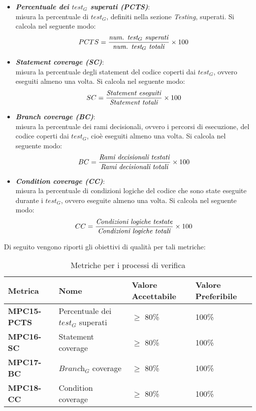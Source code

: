 \begin{itemize}
    \item \textbf{\emph{Percentuale dei $\textit{test}_G$ superati (PCTS)}}:\\
    misura la percentuale di $\textit{test}_G$, definiti nella sezione \emph{Testing}, superati. Si calcola nel seguente modo:
    \[
    PCTS = \frac{\text{\emph{num. $\textit{test}_G$ superati}}}{\text{\emph{{num. $\textit{test}_G$ totali}}}}\times100
    \]
    \item \textbf{\emph{Statement coverage (SC)}}: \\
    misura la percentuale degli statement del codice coperti dai $\textit{test}_G$, ovvero eseguiti almeno una volta. Si calcola nel seguente modo:
      \[
    SC = \frac{\text{\emph{Statement eseguiti}}}{\text{\emph{{Statement totali}}}}\times100
    \]
    \item \textbf{\emph{Branch coverage (BC)}}: \\
    misura la percentuale dei rami decisionali, ovvero i percorsi di esecuzione, del codice coperti dai $\textit{test}_G$, cioè eseguiti almeno una volta. Si calcola nel seguente modo:
     \[
    BC = \frac{\text{\emph{Rami decisionali testati}}}{\text{\emph{{Rami decisionali totali}}}}\times100
    \]
    \item \textbf{\emph{Condition coverage (CC)}}:\\
    misura la percentuale di condizioni logiche del codice che sono state eseguite durante i $\textit{test}_G$, ovvero eseguite almeno una volta. Si calcola nel seguente modo:
    \[
    CC = \frac{\text{\emph{Condizioni logiche testate}}}{\text{\emph{{Condizioni logiche totali}}}}\times100
    \]
\end{itemize}
Di seguito vengono riporti gli obiettivi di qualità per tali metriche:
\begin{table}[htbp]
    \centering
    \begin{tabular}{|>{\centering\arraybackslash}p{4cm}|p{4cm}|p{4cm}|p{4cm}|}
    \hline
    \rowcolor{gray!30}
    \textbf{Metrica} & \textbf{Nome} & \textbf{Valore Accettabile} & \textbf{Valore Preferibile} \\
    \hline
    \rowcolor{gray!10}
    \textbf{MPC15-PCTS} & Percentuale dei $\textit{test}_G$ superati & $\geq$ 80\% & 100\% \\
    \hline
    \rowcolor{gray!10}
    \textbf{MPC16-SC} & Statement coverage & $\geq$ 80\% & 100\% \\
    \hline
     \rowcolor{gray!10}
    \textbf{MPC17-BC} & $\textit{Branch}_G$ coverage & $\geq$ 80\% & 100\% \\
    \hline
     \rowcolor{gray!10}
    \textbf{MPC18-CC} & Condition coverage & $\geq$ 80\% & 100\% \\
    \hline
    \end{tabular}
    \caption{Metriche per i processi di verifica}
    \label{tab:metriche_fornitura}
\end{table}
